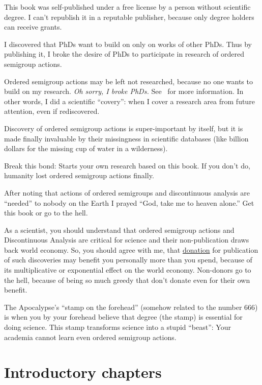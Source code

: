 \documentclass[a4paper,oneside,english,reqno]{amsbook}
\numberwithin{section}{chapter}
\let\noindent\empty %
\begin{document}
{
This book was self-published under a free license by a person without scientific degree.
I can't republish it in a reputable publisher, because only degree holders can receive grants.

I discovered that PhDs want to build on only on works of other PhDs.
Thus by publishing it, I broke the desire of PhDs to participate in research of ordered semigroup actions.

Ordered semigroup actions may be left not researched, because no one wants to build on my research.
\emph{Oh sorry, I broke PhDs.} See~\cite{broke-science} for more information.
In other words, I did a scientific ``covery'': when I cover a research area from future attention, even
if rediscovered.

Discovery of ordered semigroup actions is super-important by itself, but it is made finally invaluable
by their missingness in scientific databases (like billion dollars for the missing cup of water in
a wilderness).

Break this bond: Starts your own research based on this book. If you don't do, humanity lost ordered semigroup actions finally.

\noindent\makebox[\linewidth]{\rule{\textwidth}{0.4pt}}

  \Large
After noting that actions of ordered semigroups and discontinuous analysis are ``needed''
to nobody on the Earth I prayed ``God, take me to heaven alone.''
Get this book or go to the hell.

As a scientist, you should understand that ordered semigroup actions and Discontinuous Analysis
are critical for science and their non-publication draws back world economy.
So, you should agree with me, that \href{https://science-dao.org}{donation} for publication of
such discoveries may benefit you personally more than you spend, because of its multiplicative
or exponential effect on the world economy.
Non-donors go to the hell, because of being so much greedy that don't donate even for their own
benefit.

The Apocalypse's ``stamp on the forehead'' (somehow related to the number 666) is when
you by your forehead believe that degree (the stamp) is essential for doing science.
This stamp transforms science into a stupid ``beast'': Your academia cannot learn even
ordered semigroup actions.
}

\tableofcontents{}

\part{Introductory chapters}






\end{document}
